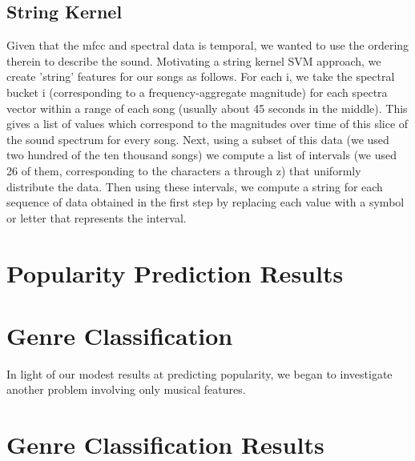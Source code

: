 \documentclass[12pt]{amsart}
\begin{document}
\begin{multicols}{2}
\subsection{String Kernel}
Given that the mfcc and spectral data is temporal, we wanted to use the ordering therein to describe the sound. Motivating a string kernel SVM approach, we create 'string' features for our songs as follows. For each i, we take the spectral bucket i (corresponding to a frequency-aggregate magnitude) for each spectra vector within a range of each song (usually about 45 seconds in the middle). This gives a list of values which correspond to the magnitudes over time of this slice of the sound spectrum for every song. Next, using a subset of this data (we used two hundred of the ten thousand songs) we compute a list of intervals (we used 26 of them, corresponding to the characters a through z)
that uniformly distribute the data. Then using these intervals, we compute a string for each sequence of data obtained in the first step by replacing each value with a symbol or letter that represents the interval.
\section{Popularity Prediction Results}
\section{Genre Classification}
In light of our modest results at predicting popularity, we began to investigate another problem involving only musical features. 
\section{Genre Classification Results}



\end{multicols}
\end{document}
